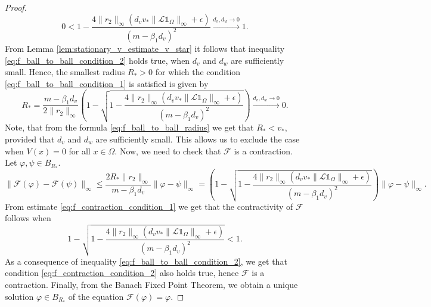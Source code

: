 \documentclass[11pt, a4paper]{article}
\theoremstyle{break}
\theoremstyle{break}
\theoremstyle{break}
\theoremstyle{break}
\theoremstyle{break}
\theoremstyle{break}
\theoremstyle{break}
\theoremstyle{break}
\theoremstyle{break}
\begin{document}
\begin{proof}
\begin{equation}
        \label{eq:f_ball_to_ball_condition_2}
        0
        <1 
        -
        \frac{4\|r_2\|_\infty(d_v v_* \|\mathcal{L}\mathds{1}_\Omega\|_\infty + \epsilon)}{(m - \beta_1 d_v)^2}
        \xrightarrow{d_v, d_w \rightarrow 0}
        1.
    \end{equation}
    From Lemma \ref{lem:stationary_v_estimate_v_star} it follows that inequality \eqref{eq:f_ball_to_ball_condition_2} holds true, when $d_v$ and $d_w$ are sufficiently small. Hence, the smallest radius $R_* > 0$ for which the condition \eqref{eq:f_ball_to_ball_condition_1} is satisfied is given by
    \begin{equation}
        \label{eq:f_ball_to_ball_radius}
        R_* = \frac{m - \beta_1 d_v}{2 \|r_2\|_\infty}
        \left(1 - 
        \sqrt{ 
        1 
        -
        \frac{4\|r_2\|_\infty(d_v v_* \|\mathcal{L}\mathds{1}_\Omega\|_\infty + \epsilon)}{(m - \beta_1 d_v)^2}
        }
        \right)
        \xrightarrow{d_v, d_w \rightarrow 0} 0.
    \end{equation}
    Note, that from the formula \eqref{eq:f_ball_to_ball_radius} we get that $R_* < v_*$, provided that $d_v$ and $d_w$ are sufficiently small. This allows us to exclude the case when $V(x) = 0$ for all $x \in \Omega$. Now, we need to check that $\mathcal{F}$ is a contraction. Let $\varphi, \psi \in B_{R_*}$.
    \begin{equation}
        \label{eq:f_contraction_condition_1}
        \| \mathcal{F}(\varphi) - \mathcal{F}(\psi) \|_\infty 
        \leq
        \frac{
        2 R_*\|r_2\|_\infty}{ m - \beta_1 d_v } \|\varphi - \psi\|_\infty
        =
        \left(1 - 
        \sqrt{ 
        1 
        -
        \frac{4\|r_2\|_\infty(d_v v_* \|\mathcal{L}\mathds{1}_\Omega\|_\infty + \epsilon)}{(m - \beta_1 d_v)^2}
        }
        \right)  \|\varphi - \psi\|_\infty
        .
    \end{equation}
    From estimate \eqref{eq:f_contraction_condition_1} we get that the contractivity of $\mathcal{F}$ follows when
    \begin{equation}
        \label{eq:f_contraction_condition_2}
        1 - 
        \sqrt{ 
        1 
        -
        \frac{4\|r_2\|_\infty(d_v v_* \|\mathcal{L}\mathds{1}_\Omega\|_\infty + \epsilon)}{(m - \beta_1 d_v)^2}
        }
        <
        1.
    \end{equation}
    As a consequence of inequality \eqref{eq:f_ball_to_ball_condition_2}, we get that condition \eqref{eq:f_contraction_condition_2} also holds true, hence $\mathcal{F}$ is a contraction. Finally, from the Banach Fixed Point Theorem, we obtain a unique solution $\varphi \in B_{R_*}$ of the equation $\mathcal{F}(\varphi) = \varphi$. 
\end{proof}
\end{document}
